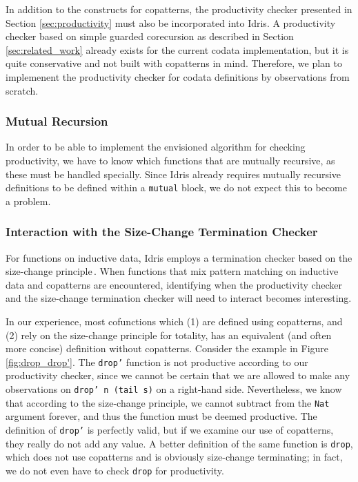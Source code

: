 

In addition to the constructs for copatterns, the productivity checker presented in Section \ref{sec:productivity} must also be incorporated into Idris. A productivity checker based on simple guarded corecursion as described in Section \ref{sec:related_work} already exists for the current codata implementation, but it is quite conservative and not built with copatterns in mind. Therefore, we plan to implemenent the productivity checker for codata definitions by observations from scratch.

\subsubsection{Mutual Recursion}
In order to be able to implement the envisioned algorithm for checking productivity, we have to know which functions that are mutually recursive, as these must be handled specially. Since Idris already requires mutually recursive definitions to be defined within a \texttt{mutual} block, we do not expect this to become a problem.

\subsubsection{Interaction with the Size-Change Termination Checker}
For functions on inductive data, Idris employs a termination checker based on the size-change principle\,\citep{LeeJones01SizeChange}. When functions that mix pattern matching on inductive data and copatterns are encountered, identifying when the productivity checker and the size-change termination checker will need to interact becomes interesting.

In our experience, most cofunctions which (1) are defined using copatterns, and (2) rely on the size-change principle for totality, has an equivalent (and often more concise) definition without copatterns. Consider the example in Figure \ref{fig:drop_drop'}. The \texttt{drop'} function is not productive according to our productivity checker, since we cannot be certain that we are allowed to make any observations on \texttt{drop' n (tail s)} on a right-hand side. Nevertheless, we know that according to the size-change principle, we cannot subtract from the \texttt{Nat} argument forever, and thus the function must be deemed productive. The definition of \texttt{drop'} is perfectly valid, but if we examine our use of copatterns, they really do not add any value. A better definition of the same function is \texttt{drop}, which does not use copatterns and is obviously size-change terminating; in fact, we do not even have to check \texttt{drop} for productivity. 

